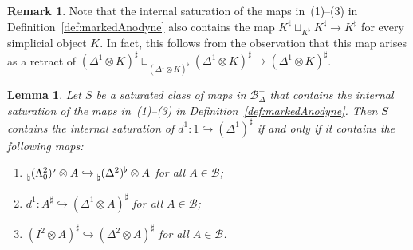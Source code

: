 \documentclass[reqno]{amsart}
\numberwithin{equation}{subsection}
\theoremstyle{plain}
\newtheorem{lemma}[equation]{Lemma}
\theoremstyle{definition}
\newtheorem{remark}[equation]{Remark}
\let\scr=\mathcal
\let\into=\hookrightarrow
\def\BB{\scr B}
\newcommand{\mSimp}[1]{#1_{\Delta}^+}
\begin{document}
\begin{remark}
	\label{rem:markedMonomorphismGenerator}
	Note that the internal saturation of the maps in~(1)--(3) in Definition~\ref{def:markedAnodyne} also contains the map $K^\sharp\sqcup_{K^\flat} K^\sharp\to K^\sharp$ for every simplicial object $K$. In fact, this follows from the observation that this map arises as a retract of $(\Delta^1\otimes K)^\sharp\sqcup_{(\Delta^1\otimes K)^\flat}(\Delta^1\otimes K)^\sharp\to(\Delta^1\otimes K)^\sharp$.
\end{remark}

\begin{lemma}
	\label{lem:markedAnodyneGenerators2}
	Let $S$ be a saturated class of maps in $\mSimp\BB$ that contains the internal saturation of the maps in~(1)--(3) in Definition~\ref{def:markedAnodyne}. Then $S$ contains the internal saturation of $d^1\colon 1\into (\Delta^1)^\sharp$ if and only if it contains the following maps:
	\begin{enumerate}
	\item $\prescript{}{\natural}(\Lambda^2_0)^\flat\otimes A\into \prescript{}{\natural}(\Delta^2)^\flat\otimes A$ for all $A\in\BB$;
	\item $d^1\colon A^\sharp\into(\Delta^1\otimes A)^\sharp$ for all $A\in\BB$;
	\item $(I^2\otimes A)^\sharp\into (\Delta^2\otimes A)^\sharp$ for all $A\in\BB$.
	\end{enumerate}
\end{lemma}
\end{document}
